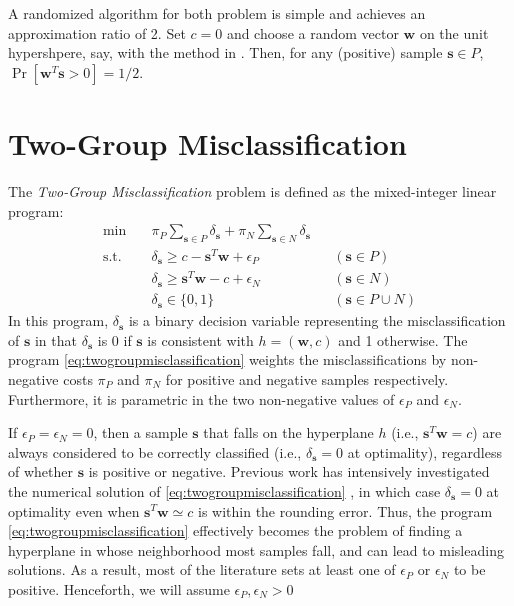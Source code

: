 \documentclass[11pt]{article}
\theoremstyle{definition}
\newcommand{\vect}[1]{\mathbf{#1}}
\newcommand{\sv}[1]{_{\vect{#1}}}
\begin{document}
A randomized algorithm for both problem is simple and achieves an approximation ratio of 2. 
Set $c = 0$ and choose a random vector $\vect{w}$ on the unit hypershpere, say, with the
method in \cite{rndvect}. Then, for any (positive) sample $\vect{s} \in P$,
$\Pr [ \vect{w}^T \vect{s} > 0 ] = 1 / 2$.

\section{Two-Group Misclassification}
The {\em Two-Group Misclassification\/} problem \cite{ClassificationOptSurvey}
is defined as the mixed-integer linear program: 
\begin{subequations}
\label{eq:twogroupmisclassification}
\begin{align}
\min\quad & 
\pi_P \sum_{\vect{s} \in P} \delta\sv{s} + 
\pi_N \sum_{\vect{s} \in N} \delta\sv{s} \\
\text{s.t.}\quad & 
\delta\sv{s} \geq c - \vect{s}^T \vect{w} + \epsilon_P & & (\vect{s} \in P) \\
& \delta\sv{s} \geq \vect{s}^T \vect{w} - c + \epsilon_N & & (\vect{s} \in N) \\
& \delta\sv{s} \in \{ 0, 1 \} & & (\vect{s} \in P \cup N) 
\end{align}
\end{subequations}
In this program, $\delta\sv{s}$ is a binary decision variable representing
the misclassification of $\vect{s}$ in that $\delta\sv{s}$ is 
0 if $\vect{s}$ is consistent with $h = (\vect{w}, c)$ and 
1 otherwise.
The program \eqref{eq:twogroupmisclassification} weights the misclassifications
by non-negative costs $\pi_P$ and $\pi_N$ 
for positive and negative samples respectively.
Furthermore, it is parametric in the two non-negative 
values of $\epsilon_P$ and $\epsilon_N$.

If $\epsilon_P = \epsilon_N = 0$, then a sample $\vect{s}$ that falls on the hyperplane $h$ (i.e., $\vect{s}^T \vect{w} = c$) are always considered to be correctly classified (i.e., $\delta\sv{s} = 0$ at optimality), regardless
of whether $\vect{s}$ is positive or negative.
Previous work has intensively investigated the numerical solution of 
\eqref{eq:twogroupmisclassification} \cite{ClassificationOptSurvey}, in which case 
$\delta\sv{s} = 0$ at optimality even when $\vect{s}^T \vect{w} \simeq c$
is within the rounding error. 
Thus, the program \eqref{eq:twogroupmisclassification} effectively
becomes the problem of finding
a hyperplane in whose neighborhood most samples fall, and can lead to 
misleading solutions. 
As a result, most of the literature sets at least one of $\epsilon_P$ or 
$\epsilon_N$ to be positive.
Henceforth, we will assume $\epsilon_P, \epsilon_N > 0$
\end{document}
